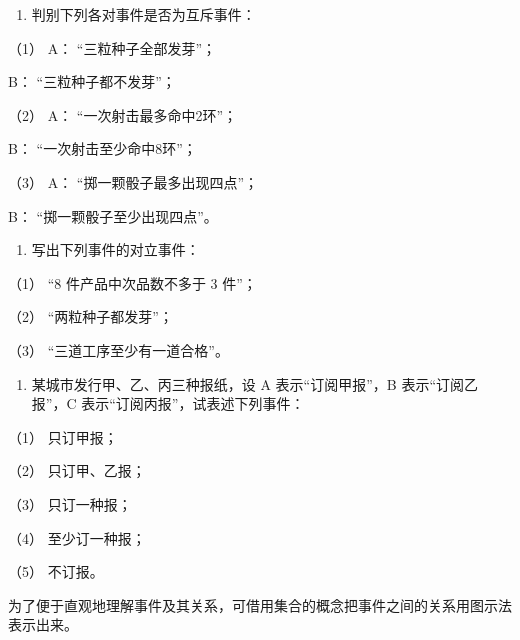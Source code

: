 \begin{enumerate}
\item
  判别下列各对事件是否为互斥事件：
\end{enumerate}

（1） A： ``三粒种子全部发芽''；

B： ``三粒种子都不发芽''；

（2） A： ``一次射击最多命中2环''；

B： ``一次射击至少命中8环''；

（3） A： ``掷一颗骰子最多出现四点''；

B： ``掷一颗骰子至少出现四点''。

\begin{enumerate}[start=2]
\item
  写出下列事件的对立事件：
\end{enumerate}

（1） ``8 件产品中次品数不多于 3 件''；

（2） ``两粒种子都发芽''；

（3） ``三道工序至少有一道合格''。

\begin{enumerate}[start=3]
\item
  某城市发行甲、乙、丙三种报纸，设 A 表示``订阅甲报''，B
  表示``订阅乙报''，C 表示``订阅丙报''，试表述下列事件：
\end{enumerate}

（1） 只订甲报；

（2） 只订甲、乙报；

（3） 只订一种报；

（4） 至少订一种报；

（5） 不订报。

为了便于直观地理解事件及其关系，可借用集合的概念把事件之间的关系用图示法表示出来。

